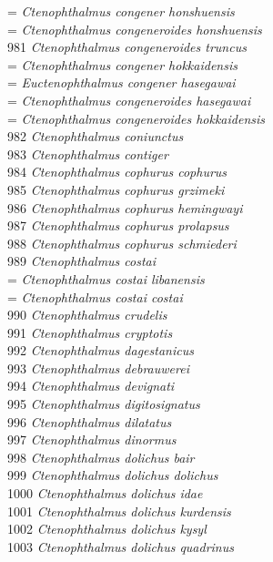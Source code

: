 \documentclass[
]{article}
\begin{document}
= \emph{Ctenophthalmus congener honshuensis}\\
= \emph{Ctenophthalmus congeneroides honshuensis}\\
981 \emph{Ctenophthalmus congeneroides truncus}\\
= \emph{Ctenophthalmus congener hokkaidensis}\\
= \emph{Euctenophthalmus congener hasegawai}\\
= \emph{Ctenophthalmus congeneroides hasegawai}\\
= \emph{Ctenophthalmus congeneroides hokkaidensis}\\
982 \emph{Ctenophthalmus coniunctus}\\
983 \emph{Ctenophthalmus contiger}\\
984 \emph{Ctenophthalmus cophurus cophurus}\\
985 \emph{Ctenophthalmus cophurus grzimeki}\\
986 \emph{Ctenophthalmus cophurus hemingwayi}\\
987 \emph{Ctenophthalmus cophurus prolapsus}\\
988 \emph{Ctenophthalmus cophurus schmiederi}\\
989 \emph{Ctenophthalmus costai}\\
= \emph{Ctenophthalmus costai libanensis}\\
= \emph{Ctenophthalmus costai costai}\\
990 \emph{Ctenophthalmus crudelis}\\
991 \emph{Ctenophthalmus cryptotis}\\
992 \emph{Ctenophthalmus dagestanicus}\\
993 \emph{Ctenophthalmus debrauwerei}\\
994 \emph{Ctenophthalmus devignati}\\
995 \emph{Ctenophthalmus digitosignatus}\\
996 \emph{Ctenophthalmus dilatatus}\\
997 \emph{Ctenophthalmus dinormus}\\
998 \emph{Ctenophthalmus dolichus bair}\\
999 \emph{Ctenophthalmus dolichus dolichus}\\
1000 \emph{Ctenophthalmus dolichus idae}\\
1001 \emph{Ctenophthalmus dolichus kurdensis}\\
1002 \emph{Ctenophthalmus dolichus kysyl}\\
1003 \emph{Ctenophthalmus dolichus quadrinus}\\
\end{document}
